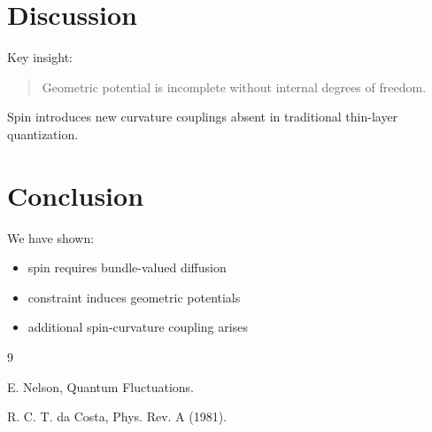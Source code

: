 \documentclass[11pt]{article}
\begin{document}
\section{Discussion}

Key insight:

\begin{quote}
Geometric potential is incomplete without internal degrees of freedom.
\end{quote}

Spin introduces new curvature couplings absent in traditional thin-layer quantization.

\section{Conclusion}

We have shown:

\begin{itemize}
\item spin requires bundle-valued diffusion
\item constraint induces geometric potentials
\item additional spin-curvature coupling arises
\end{itemize}

\begin{thebibliography}{9}

E. Nelson, Quantum Fluctuations.

R. C. T. da Costa, Phys. Rev. A (1981).

\end{thebibliography}
\end{document}
